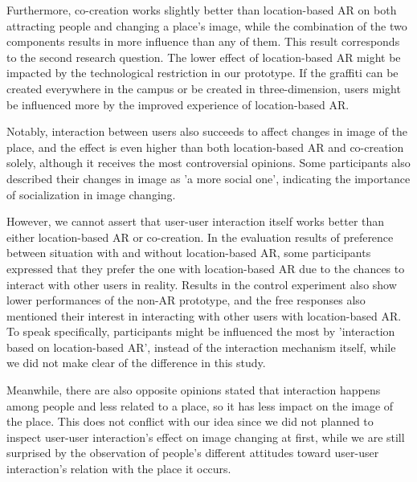 Furthermore, co-creation works slightly better than location-based AR on both attracting people and changing a place's image, while the combination of the two components results in more influence than any of them. This result corresponds to the second research question.
The lower effect of location-based AR might be impacted by the technological restriction in our prototype. If the graffiti can be created everywhere in the campus or be created in three-dimension, users might be influenced more by the improved experience of location-based AR.

Notably, interaction between users also succeeds to affect changes in image of the place, and the effect is even higher than both location-based AR and co-creation solely, although it receives the most controversial opinions.
Some participants also described their changes in image as 'a more social one', indicating the importance of socialization in image changing.

However, we cannot assert that user-user interaction itself works better than either location-based AR or co-creation.
In the evaluation results of preference between situation with and without location-based AR, some participants expressed that they prefer the one with location-based AR due to the chances to interact with other users in reality.
Results in the control experiment also show lower performances of the non-AR prototype, and the free responses also mentioned their interest in interacting with other users with location-based AR.
To speak specifically, participants might be influenced the most by 'interaction based on location-based AR', instead of the interaction mechanism itself, while we did not make clear of the difference in this study.

Meanwhile, there are also opposite opinions stated that interaction happens among people and less related to a place, so it has less impact on the image of the place.
This does not conflict with our idea since we did not planned to inspect user-user interaction's effect on image changing at first, while we are still surprised by the observation of people's different attitudes toward user-user interaction's relation with the place it occurs.

